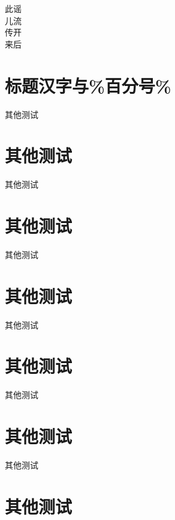 \documentclass[cs4size,a4paper,fancyhdr,fntef,UTF8,adobefonts,hyperref]{ctexbook}
\begin{document}







\begin{CTEXfilltwosides}{3cm}
此谣 \\
儿流 \\
传开 \\
来后
\end{CTEXfilltwosides}


\chapter{标题汉字与\%百分号\%}

其他测试

\chapter{其他测试}

其他测试

\chapter{其他测试}

其他测试

\chapter{其他测试}

其他测试

\chapter{其他测试}

其他测试

\chapter{其他测试}

其他测试

\chapter{其他测试}
\end{document}

